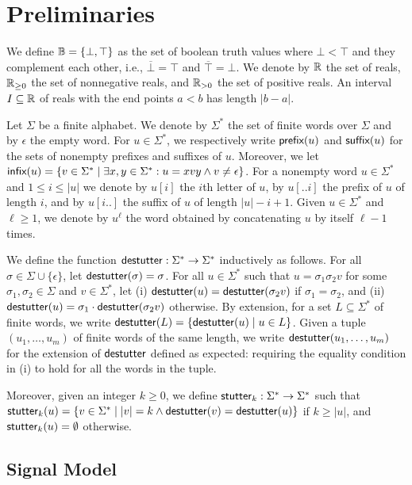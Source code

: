 \section{Preliminaries}

We define $\mathbb{B} = \{ \bot, \top \}$ as the set of boolean truth values where $\bot < \top$ and they complement each other, i.e., $\overline{\bot} = \top$ and $\overline{\top} = \bot$.
We denote by $\mathbb{R}$ the set of reals, $\mathbb{R}_{\geq 0}$ the set of nonnegative reals, and $\mathbb{R}_{> 0}$ the set of positive reals.
An interval $I \subseteq \mathbb{R}$ of reals with the end points $a < b$ has length $|b-a|$.

Let $\Sigma$ be a finite alphabet.
We denote by $\Sigma^*$ the set of finite words over $\Sigma$ and by $\epsilon$ the empty word.
For $u \in \Sigma^*$, we respectively write $\textsf{prefix}(u)$ and $\textsf{suffix}(u)$ for the sets of nonempty prefixes and suffixes of $u$.
Moreover, we let $\infx(u) = \{v \in \Sigma^* \st \exists x,y \in \Sigma^* : u = xvy \land v \neq \epsilon\}$.
For a nonempty word $u \in \Sigma^*$ and $1 \leq i \leq |u|$ we denote by $u[i]$ the $i$th letter of $u$, by $u[..i]$ the prefix of $u$ of length $i$, and by $u[i..]$ the suffix of $u$ of length $|u| - i + 1$. 
Given $u \in \Sigma^*$ and $\ell \geq 1$, we denote by $u^\ell$ the word obtained by concatenating $u$ by itself $\ell - 1$ times.

We define the function $\mathsf{destutter} : \Sigma^* \to \Sigma^*$ inductively as follows.
For all $\sigma \in \Sigma \cup \{\epsilon\}$, let $\mathsf{destutter}(\sigma) = \sigma$.
For all $u \in \Sigma^*$ such that $u = \sigma_1 \sigma_2 v$ for some $\sigma_1,\sigma_2 \in \Sigma$ and $v \in \Sigma^*$, let (i) $\mathsf{destutter}(u) = \mathsf{destutter}(\sigma_2 v)$ if $\sigma_1 = \sigma_2$, and (ii) $\mathsf{destutter}(u) = \sigma_1 \cdot \mathsf{destutter}(\sigma_2 v)$ otherwise.
By extension, for a set $L \subseteq \Sigma^*$ of finite words, we write $\destutter(L) = \{\destutter(u) \st u \in L\}$.
Given a tuple $(u_1, \ldots, u_m)$ of finite words of the same length, we write $\mathsf{destutter}(u_1, \ldots, u_m)$ for the extension of $\mathsf{destutter}$ defined as expected: requiring the equality condition in (i) to hold for all the words in the tuple.


Moreover, given an integer $k \geq 0$, we define $\mathsf{stutter}_k : \Sigma^* \to \Sigma^*$ such that $\stutter_k(u) = \{v \in \Sigma^* \st |v| = k \land \destutter(v) = \destutter(u)\}$ if $k \geq |u|$, and $\mathsf{stutter}_k(u) = \emptyset$ otherwise.

\subsection{Signal Model}

